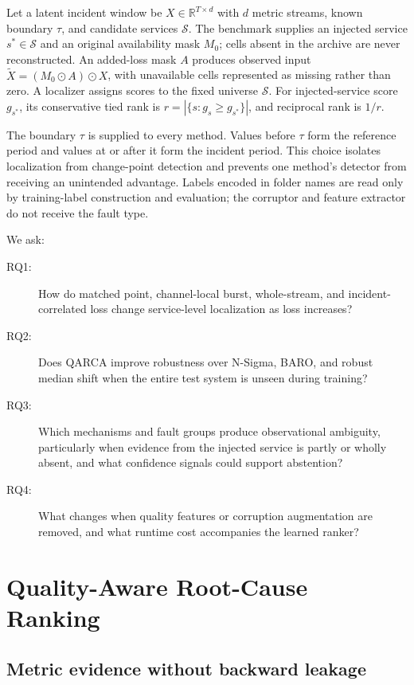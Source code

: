 \documentclass[runningheads]{llncs}
\begin{document}
Let a latent incident window be $X\in\mathbb{R}^{T\times d}$ with $d$ metric
streams, known boundary $\tau$, and candidate services $\mathcal{S}$. The
benchmark supplies an injected service $s^*\in\mathcal{S}$ and an original
availability mask $M_0$; cells absent in the archive are never reconstructed.
An added-loss mask $A$ produces observed input
$\widetilde{X}=(M_0\odot A)\odot X$, with unavailable cells represented as
missing rather than zero. A localizer assigns scores to the fixed universe
$\mathcal{S}$. For injected-service score $g_{s^*}$, its conservative tied rank
is $r=|\{s:g_s\geq g_{s^*}\}|$, and reciprocal rank is $1/r$.

The boundary $\tau$ is supplied to every method. Values before $\tau$ form the
reference period and values at or after it form the incident period. This
choice isolates localization from change-point detection and prevents one
method's detector from receiving an unintended advantage. Labels encoded in
folder names are read only by training-label construction and evaluation; the
corruptor and feature extractor do not receive the fault type.

We ask:

\begin{description}
\item[RQ1:] How do matched point, channel-local burst, whole-stream, and
incident-correlated loss change service-level localization as loss increases?
\item[RQ2:] Does QARCA improve robustness over N-Sigma, BARO, and robust
median shift when the entire test system is unseen during training?
\item[RQ3:] Which mechanisms and fault groups produce observational ambiguity,
particularly when evidence from the injected service is partly or wholly
absent, and what confidence signals could support abstention?
\item[RQ4:] What changes when quality features or corruption augmentation are
removed, and what runtime cost accompanies the learned ranker?
\end{description}

\section{Quality-Aware Root-Cause Ranking}

\subsection{Metric evidence without backward leakage}
\end{document}
